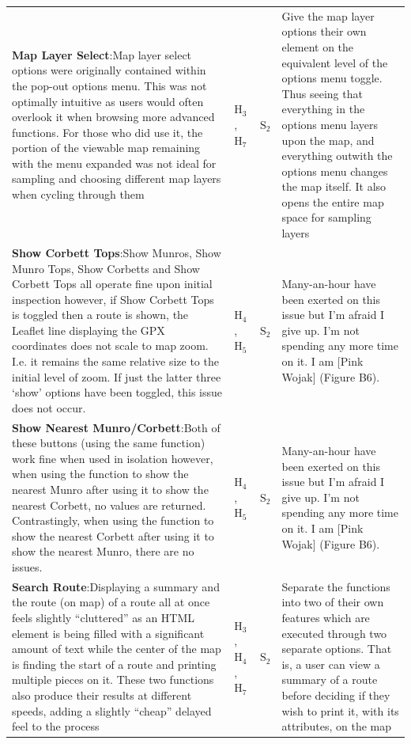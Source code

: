 \documentclass[11pt, english]{article}
\begin{document}
\begin{center}
\begin{longtable}{p{7.5cm}p{0.5cm}p{0.5cm}p{4cm}}
		\textbf{Map Layer Select}:\newline Map layer select options were originally contained within the pop-out options menu. This was not optimally intuitive as users would often overlook it when browsing more advanced functions. For those who did use it, the portion of the viewable map remaining with the menu expanded was not ideal for sampling and choosing different map layers when cycling through them & $\mathrm{H_{3}}$, $\mathrm{H_{7}}$ & $\mathrm{S_{2}}$ & Give the map layer options their own element on the equivalent level of the options menu toggle. Thus seeing that everything in the options menu layers upon the map, and everything outwith the options menu changes the map itself. It also opens the entire map space for sampling layers\\
		\textbf{Show Corbett Tops}:\newline Show Munros, Show Munro Tops, Show Corbetts and Show Corbett Tops all operate fine upon initial inspection however, if Show Corbett Tops is toggled then a route is shown, the Leaflet line displaying the GPX coordinates does not scale to map zoom. I.e. it remains the same relative size to the initial level of zoom. If just the latter three `show' options have been toggled, this issue does not occur. & $\mathrm{H_{4}}$, $\mathrm{H_{5}}$ & $\mathrm{S_{2}}$ & Many-an-hour have been exerted on this issue but I'm afraid I give up. I'm not spending any more time on it. I am [Pink Wojak] (Figure B6).\\
		\textbf{Show Nearest Munro/Corbett}:\newline Both of these buttons (using the same function) work fine when used in isolation however, when using the function to show the nearest Munro after using it to show the nearest Corbett, no values are returned. Contrastingly, when using the function to show the nearest Corbett after using it to show the nearest Munro, there are no issues. & $\mathrm{H_{4}}$, $\mathrm{H_{5}}$ & $\mathrm{S_{2}}$ & Many-an-hour have been exerted on this issue but I'm afraid I give up. I'm not spending any more time on it. I am [Pink Wojak] (Figure B6).\\
		\textbf{Search Route}:\newline Displaying a summary and the route (on map) of a route all at once feels slightly ``cluttered'' as an HTML element is being filled with a significant amount of text while the center of the map is finding the start of a route and printing multiple pieces on it. These two functions also produce their results at different speeds, adding a slightly ``cheap'' delayed feel to the process & $\mathrm{H_{3}}$, $\mathrm{H_{4}}$, $\mathrm{H_{7}}$ & $\mathrm{S_{2}}$ & Separate the functions into two of their own features which are executed through two separate options. That is, a user can view a summary of a route before deciding if they wish to print it, with its attributes, on the map\\

\end{longtable}
\end{center}
\end{document}
